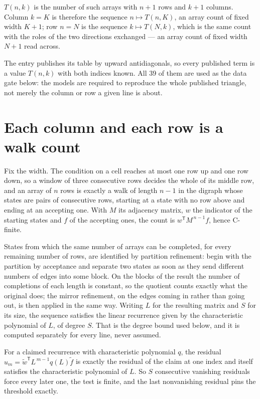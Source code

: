 \documentclass[11pt]{article}
\theoremstyle{definition}
\begin{document}
$T(n,k)$ is the number of such arrays with $n + 1$ rows and $k + 1$ columns. Column $k = K$ is therefore the sequence $n \mapsto T(n,K)$, an array count of fixed width $K + 1$; row $n = N$ is the sequence $k \mapsto T(N,k)$, which is the same count with the roles of the two directions exchanged --- an array count of fixed width $N + 1$ read across.

The entry publishes its table by upward antidiagonals, so every published term is a value $T(n,k)$ with both indices known. All 39 of them are used as the data gate below: the models are required to reproduce the whole published triangle, not merely the column or row a given line is about.

\section{Each column and each row is a walk count}

Fix the width. The condition on a cell reaches at most one row up and one row down, so a window of three consecutive rows decides the whole of its middle row, and an array of $n$ rows is exactly a walk of length $n-1$ in the digraph whose states are pairs of consecutive rows, starting at a state with no row above and ending at an accepting one. With $M$ its adjacency matrix, $w$ the indicator of the starting states and $f$ of the accepting ones, the count is $w^{\mathsf T}M^{\,n-1}f$, hence C-finite.

States from which the same number of arrays can be completed, for every remaining number of rows, are identified by partition refinement: begin with the partition by acceptance and separate two states as soon as they send different numbers of edges into some block. On the blocks of the result the number of completions of each length is constant, so the quotient counts exactly what the original does; the mirror refinement, on the edges coming in rather than going out, is then applied in the same way. Writing $L$ for the resulting matrix and $S$ for its size, the sequence satisfies the linear recurrence given by the characteristic polynomial of $L$, of degree $S$. That is the degree bound used below, and it is computed separately for every line, never assumed.

For a claimed recurrence with characteristic polynomial $q$, the residual $u_m = \tilde w^{\mathsf T}L^{\,m-1}q(L)\tilde f$ is exactly the residual of the claim at one index and itself satisfies the characteristic polynomial of $L$. So $S$ consecutive vanishing residuals force every later one, the test is finite, and the last nonvanishing residual pins the threshold exactly.
\end{document}
